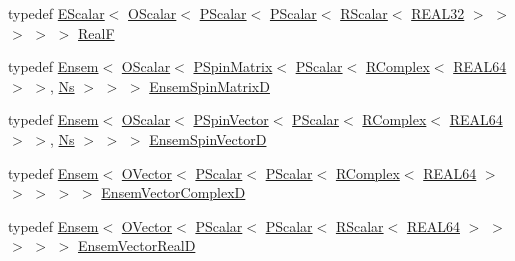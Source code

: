 \begin{DoxyCompactItemize}
typedef \mbox{\hyperlink{classENSEM_1_1EScalar}{E\+Scalar}}$<$ \mbox{\hyperlink{classENSEM_1_1OScalar}{O\+Scalar}}$<$ \mbox{\hyperlink{classENSEM_1_1PScalar}{P\+Scalar}}$<$ \mbox{\hyperlink{classENSEM_1_1PScalar}{P\+Scalar}}$<$ \mbox{\hyperlink{classENSEM_1_1RScalar}{R\+Scalar}}$<$ \mbox{\hyperlink{namespaceENSEM_a7540d01191172323e9073283d772576d}{R\+E\+A\+L32}} $>$ $>$ $>$ $>$ $>$ \mbox{\hyperlink{group__defs_gaaff7cc896fceee5b1ea6ba88497469ab}{RealF}}
\item 
typedef \mbox{\hyperlink{classENSEM_1_1Ensem}{Ensem}}$<$ \mbox{\hyperlink{classENSEM_1_1OScalar}{O\+Scalar}}$<$ \mbox{\hyperlink{classENSEM_1_1PSpinMatrix}{P\+Spin\+Matrix}}$<$ \mbox{\hyperlink{classENSEM_1_1PScalar}{P\+Scalar}}$<$ \mbox{\hyperlink{classENSEM_1_1RComplex}{R\+Complex}}$<$ \mbox{\hyperlink{namespaceENSEM_a85b215b9f1f43715aebee01718e25082}{R\+E\+A\+L64}} $>$ $>$, \mbox{\hyperlink{namespaceENSEM_a6f05e048f9b2eb1a19131074f8abc25f}{Ns}} $>$ $>$ $>$ \mbox{\hyperlink{group__defs_ga06a2bf065fb18ba1aa1217fc56b85e94}{Ensem\+Spin\+MatrixD}}
\item 
typedef \mbox{\hyperlink{classENSEM_1_1Ensem}{Ensem}}$<$ \mbox{\hyperlink{classENSEM_1_1OScalar}{O\+Scalar}}$<$ \mbox{\hyperlink{classENSEM_1_1PSpinVector}{P\+Spin\+Vector}}$<$ \mbox{\hyperlink{classENSEM_1_1PScalar}{P\+Scalar}}$<$ \mbox{\hyperlink{classENSEM_1_1RComplex}{R\+Complex}}$<$ \mbox{\hyperlink{namespaceENSEM_a85b215b9f1f43715aebee01718e25082}{R\+E\+A\+L64}} $>$ $>$, \mbox{\hyperlink{namespaceENSEM_a6f05e048f9b2eb1a19131074f8abc25f}{Ns}} $>$ $>$ $>$ \mbox{\hyperlink{group__defs_gae8a1e894c16ec6be00388813ab08115c}{Ensem\+Spin\+VectorD}}
\item 
typedef \mbox{\hyperlink{classENSEM_1_1Ensem}{Ensem}}$<$ \mbox{\hyperlink{classENSEM_1_1OVector}{O\+Vector}}$<$ \mbox{\hyperlink{classENSEM_1_1PScalar}{P\+Scalar}}$<$ \mbox{\hyperlink{classENSEM_1_1PScalar}{P\+Scalar}}$<$ \mbox{\hyperlink{classENSEM_1_1RComplex}{R\+Complex}}$<$ \mbox{\hyperlink{namespaceENSEM_a85b215b9f1f43715aebee01718e25082}{R\+E\+A\+L64}} $>$ $>$ $>$ $>$ $>$ \mbox{\hyperlink{group__defs_gaaee70d31501194625b4827518c28934c}{Ensem\+Vector\+ComplexD}}
\item 
typedef \mbox{\hyperlink{classENSEM_1_1Ensem}{Ensem}}$<$ \mbox{\hyperlink{classENSEM_1_1OVector}{O\+Vector}}$<$ \mbox{\hyperlink{classENSEM_1_1PScalar}{P\+Scalar}}$<$ \mbox{\hyperlink{classENSEM_1_1PScalar}{P\+Scalar}}$<$ \mbox{\hyperlink{classENSEM_1_1RScalar}{R\+Scalar}}$<$ \mbox{\hyperlink{namespaceENSEM_a85b215b9f1f43715aebee01718e25082}{R\+E\+A\+L64}} $>$ $>$ $>$ $>$ $>$ \mbox{\hyperlink{group__defs_ga7e294215cc7d7c343921ba1aef53d4dd}{Ensem\+Vector\+RealD}}

\end{DoxyCompactItemize}
